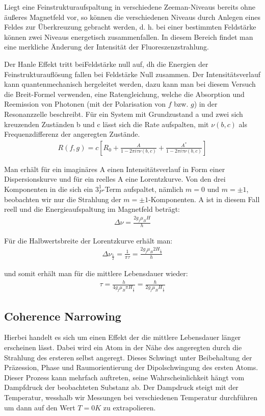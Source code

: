 \documentclass[12pt]{article}
\begin{document}
Liegt eine Feinstrukturaufspaltung in verschiedene Zeeman-Niveaus bereits ohne äußeres Magnetfeld vor, so können die verschiedenen Niveaus durch Anlegen eines Feldes zur Überkreuzung gebracht werden, d. h. bei einer bestimmten Feldstärke können zwei Niveaus energetisch zusammenfallen. In diesem Bereich findet man eine merkliche Änderung der Intensität der Fluoreszenzstrahlung.

Der Hanle Effekt tritt beiFeldstärke null auf, dh die Energien der Feinstrukturauflösung fallen bei Feldstärke Null zusammen. Der Intensitätsverlauf kann quantenmechanisch hergeleitet werden, dazu kann man bei diesem Versuch die Breit-Formel verwenden, eine Ratengleichung, welche die Absorption und Reemission von Photonen (mit der Polarisation von $f$ bzw. $g$) in der Resonanzzelle beschreibt. Für ein System mit Grundzustand a und zwei sich kreuzenden Zuständen b und c lässt sich die Rate aufspalten, mit $\nu(b,c)$ als Frequenzdifferenz der angeregten Zustände.
\begin{align}
 R(f,g)=c\left[ R_0+\frac{A}{1-2\pi i \tau \nu (b,c)}+\frac{A^*}{1-2\pi i \tau \nu (b,c)}\right]
\end{align}

Man erhält für ein imaginäres A einen Intensitätsverlauf in Form einer Dispersionskurve und für ein reelles A eine Lorentzkurve. Von den drei Komponenten in die sich ein $3_P^1$-Term aufspaltet, nämlich $m = 0$ und $m = \pm 1$, beobachten wir nur die Strahlung der $m = \pm1$-Komponenten. A ist in diesem Fall reell und die Energieaufspaltung im Magnetfeld beträgt:
\begin{align}
 \Delta \nu = \frac{2 g_j \mu_B H}{h}
\end{align}

Für die Halbwertsbreite der Lorentzkurve erhält man:
\begin{align}
 \Delta \nu_{\frac{1}{2}} = \frac{1}{\pi \tau} = \frac{2 g_j \mu_B 2 H_{\frac{1}{2}}}{h}
\end{align}

und somit erhält man für die mittlere Lebensdauer wieder:
\begin{align}
 \tau = \frac{h}{4 g_j \mu_B \pi H_{\frac{1}{2}}} = \frac{\hbar}{2 g_j \mu_B H_{\frac{1}{2}}}
\end{align}

\subsection{Coherence Narrowing}
Hierbei handelt es sich um einen Effekt der die mittlere Lebensdauer länger erscheinen lässt. Dabei wird ein Atom in der Nähe des angeregten durch die Strahlung des ersteren selbst angeregt. Dieses Schwingt unter Beibehaltung der Präzession, Phase und Raumorientierung der Dipolschwingung des ersten Atoms. Dieser Prozess kann mehrfach auftreten, seine Wahrscheinlichkeit hängt vom Dampfdruck der beobachteten Substanz ab. Der Dampdruck steigt mit der Temperatur, wesshalb wir Messungen bei verschiedenen Temperatur durchführen um dann auf den Wert $T=0K$ zu extrapolieren.
\newpage
\end{document}
